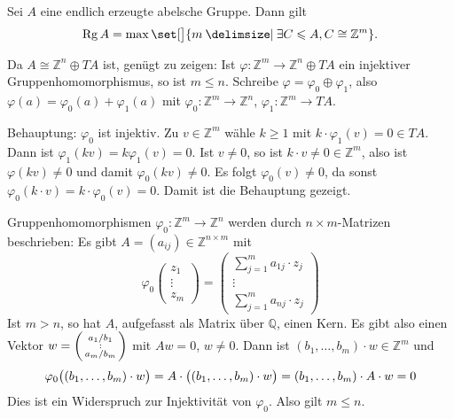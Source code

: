 \begin{lemma}[{name=[Rang einer endlich erzeugten abelschen Gruppe]}]
	Sei $A$ eine endlich erzeugte abelsche Gruppe. Dann gilt 
	\[
		\Rg A = \max \set[\big]{m \given \exists C \le A, C \cong \mathbb{Z}^m}.
	\]
\end{lemma}
\begin{beweis}
	Da $A \cong \mathbb{Z}^n \oplus T A$ ist, genügt zu zeigen: Ist $\varphi \colon \mathbb{Z}^m \to \mathbb{Z}^n \oplus T A$ ein injektiver Gruppenhomomorphismus, so ist 
	$m \le n$. Schreibe $\varphi = \varphi_0 \oplus \varphi_1$, also $\varphi(a) = \varphi_0(a) + \varphi_1(a)$ mit $\varphi_0 \colon \mathbb{Z}^m \to \mathbb{Z}^n$, 
	$\varphi_1 \colon \mathbb{Z}^m \to T A$. 

	Behauptung: $\varphi_0$ ist injektiv. Zu $v \in \mathbb{Z}^m$ wähle $k\ge 1$ mit $k \cdot \varphi_1(v) = 0 \in T A$. Dann ist $\varphi_1(k v) = k \varphi_1(v)=0$.
	Ist $v \not= 0$, so ist $k \cdot v \not= 0 \in \mathbb{Z}^m$, also ist $\varphi(k v) \not= 0$ und damit $\varphi_0(k v) \not= 0$. Es folgt $\varphi_0(v) \not= 0$, da sonst
	$\varphi_0(k \cdot v) = k \cdot \varphi_0(v)= 0$. Damit ist die Behauptung gezeigt.

	Gruppenhomomorphismen $\varphi_0 \colon \mathbb{Z}^m \to \mathbb{Z}^n$ werden durch $n \times m$-Matrizen beschrieben: Es gibt $A= (a_{ij}) \in \mathbb{Z}^{n \times m}$ mit
	\[
		\varphi_0 \begin{pmatrix}
			z_1 \\ \vdots \\ z_m
		\end{pmatrix} = \begin{pmatrix}
			\sum_{j=1}^{m} a_{1j} \cdot z_j \\
			\vdots \\
			\sum_{j=1}^{m} a_{nj} \cdot z_j
		\end{pmatrix}
	\]
	Ist $m >n$, so hat $A$, aufgefasst als Matrix über $\mathbb{Q}$, einen Kern. Es gibt also einen Vektor $w = \begin{psmallmatrix}a_1/b_1 \\ : \\ a_m/b_m\end{psmallmatrix}$
	mit $A w = 0$, $w \not=0$. Dann ist $(b_1, \ldots , b_m) \cdot w \in \mathbb{Z}^m$ und 
	\[
		\varphi_0 \enbrace[\big]{(b_1, \ldots , b_m)\cdot w} = A \cdot \enbrace[\big]{(b_1, \ldots , b_m) \cdot w} = (b_1, \ldots , b_m) \cdot A \cdot w = 0
	\]
	Dies ist ein Widerspruch zur Injektivität von $\varphi_0$. Also gilt $m \le n$.
\end{beweis}

